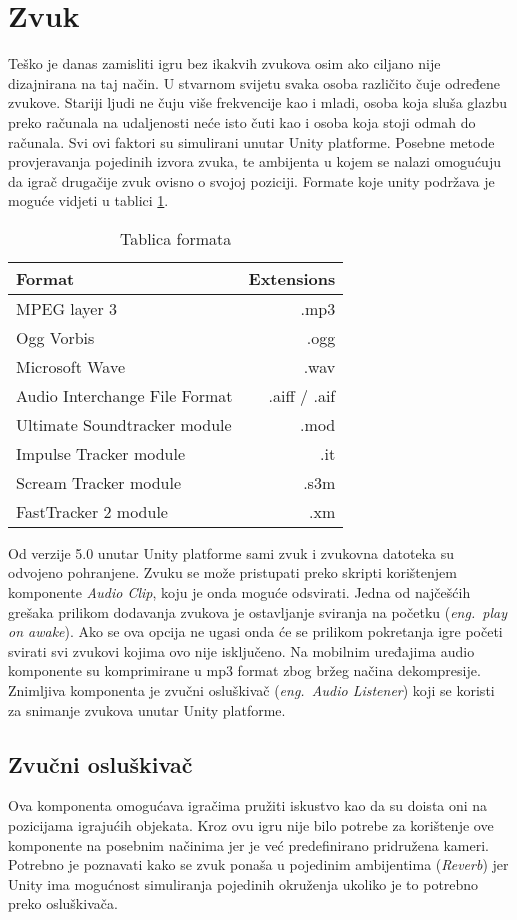 \section{Zvuk}
Teško je danas zamisliti igru bez ikakvih zvukova osim ako ciljano nije dizajnirana na taj način. U stvarnom svijetu svaka osoba različito čuje određene zvukove. Stariji ljudi ne čuju više frekvencije kao i mladi, osoba koja sluša glazbu preko računala na udaljenosti neće isto čuti kao i osoba koja stoji odmah do računala. Svi ovi faktori su simulirani unutar Unity platforme. Posebne metode provjeravanja pojedinih izvora zvuka, te ambijenta u kojem se nalazi omogućuju da igrač drugačije zvuk ovisno o svojoj poziciji. Formate koje unity podržava je moguće vidjeti u tablici \ref{table:tblFormati}.

\begin{center}
\begin{table}[h]
\large
\begin{tabular}{ l r } \hline	
	Format & Extensions \\
	\hline MPEG layer 3 & .mp3 \\
	 Ogg Vorbis  & .ogg \\
	 Microsoft Wave  & .wav \\
	 Audio Interchange File Format & .aiff / .aif \\
	Ultimate Soundtracker module  & .mod \\
	 Impulse Tracker module  & .it \\
	 Scream Tracker module & .s3m \\
	 FastTracker 2 module  & .xm \\
	 \hline
\end{tabular}
	\caption{Tablica formata}
	\label{table:tblFormati}
\end{table}
\end{center}
Od verzije 5.0 unutar Unity platforme sami zvuk i zvukovna datoteka su odvojeno pohranjene. Zvuku se može pristupati preko skripti korištenjem komponente \emph{Audio Clip}, koju je onda moguće odsvirati. Jedna od najčešćih grešaka prilikom dodavanja zvukova je ostavljanje sviranja na početku (\emph{eng.~play on awake}). Ako se ova opcija ne ugasi onda će se prilikom pokretanja igre početi svirati svi zvukovi kojima ovo nije isključeno. Na mobilnim uređajima audio komponente su komprimirane u mp3 format zbog bržeg načina dekompresije. Znimljiva komponenta je zvučni osluškivač (\emph{eng.~Audio Listener}) koji se koristi za snimanje zvukova unutar Unity platforme.
\newpage
\subsection{Zvučni osluškivač}
Ova komponenta omogućava igračima pružiti iskustvo kao da su doista oni na pozicijama igrajućih objekata. Kroz ovu igru nije bilo potrebe za korištenje ove komponente na posebnim načinima jer je već predefinirano pridružena kameri. Potrebno je poznavati kako se zvuk ponaša u pojedinim ambijentima (\emph{Reverb}) jer Unity ima mogućnost simuliranja pojedinih okruženja ukoliko je to potrebno preko osluškivača.

